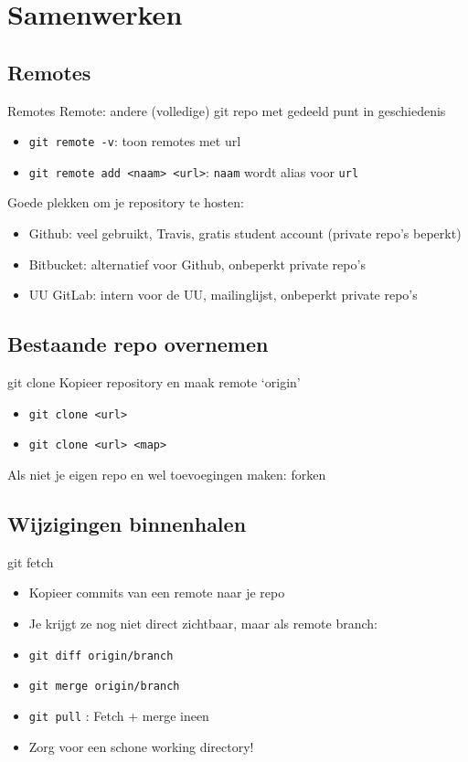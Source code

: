 \section{Samenwerken}

\subsection{Remotes}
\begin{frame}{Remotes}
	Remote: andere (volledige) git repo met gedeeld punt in geschiedenis
	\begin{itemize}
		\item \texttt{git remote -v}: toon remotes met url
		\item \texttt{git remote add <naam> <url>}: \texttt{naam} wordt alias voor \texttt{url}
	\end{itemize}
	Goede plekken om je repository te hosten:
	\begin{itemize}
		\item Github: veel gebruikt, Travis, gratis student account (private repo's beperkt)
		\item Bitbucket: alternatief voor Github, onbeperkt private repo's
		\item UU GitLab: intern voor de UU, mailinglijst, onbeperkt private repo's
	\end{itemize}
\end{frame}

\subsection{Bestaande repo overnemen}
\begin{frame}{git clone}
	Kopieer repository en maak remote `origin'
	\begin{itemize}
		\item \texttt{git clone <url>}
		\item \texttt{git clone <url> <map>}
	\end{itemize}
	Als niet je eigen repo en wel toevoegingen maken: forken
\end{frame}

\subsection{Wijzigingen binnenhalen}
\begin{frame}{git fetch}
	\begin{itemize}
		\item Kopieer commits van een remote naar je repo
		\item Je krijgt ze nog niet direct zichtbaar, maar als remote branch:
		\item \texttt{git diff origin/branch}
		\item \texttt{git merge origin/branch}
		\item \texttt{git pull} : Fetch + merge ineen
		\item Zorg voor een schone working directory!
	\end{itemize}
\end{frame}

